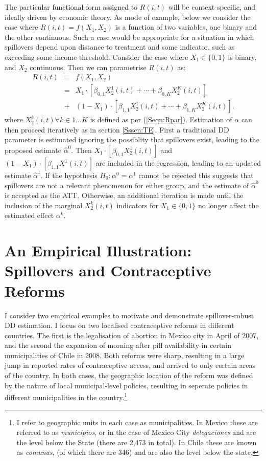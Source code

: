 The particular functional form assigned to $R(i,t)$ will be context-specific,
and ideally driven by economic theory.  As mode of example, below we consider the
case where $R(i,t)=f(X_1,X_2)$ is a function of two variables, one binary and
the other continuous.  Such a case would be appropriate for a situation in which
spillovers depend upon distance to treatment and some indicator, such as exceeding
some income threshold.  Consider the case where $X_1\in \{0,1\}$ is binary, and 
$X_2$ continuous.  Then we can parametrise $R(i,t)$ as:
\begin{eqnarray}
R(i,t)&=&f(X_1,X_2) \nonumber \\
      &=&X_1\cdot[\beta_{0,1}X_2^1(i,t)+ \cdots + \beta_{0,K}X_2^K(i,t)] \nonumber \\
      &+& (1-X_1)\cdot[\beta_{1,1}X_2^1(i,t)+ \cdots + \beta_{1,K}X_2^K(i,t)]. \nonumber
\end{eqnarray}
where $X_2^k(i,t) \forall k \in 1\ldots K$ is defined as per (\ref{Seqn:Rpar}).  
Estimation of $\alpha$ 
can then proceed iteratively as in section \ref{Ssscn:TE}.  First a traditional 
DD parameter is estimated ignoring the possiblity that spillovers exist, leading 
to the proposed estimate $\hat\alpha^0$.  Then $X_1\cdot[\beta_{0,1}X_2^1(i,t)]$ 
and $(1-X_1)\cdot[\beta_{1,1}X^1(i,t)]$ are included in the regression, leading to 
an updated estimate $\hat\alpha^1$.  If the hypothesis $H_0: \alpha^0=\alpha^1$ 
cannot be rejected this suggests that spillovers are not a relevant phenomenon 
for either group, and the estimate of $\hat\alpha^0$ is accepted as the ATT.  
Otherwise, an additional iteration is made until the inclusion of the marginal 
$X_2^k(i,t)$ indicators for $X_1 \in \{0,1\}$ no longer affect the estimated 
effect $\alpha^k$.

\section{An Empirical Illustration: Spillovers and Contraceptive Reforms}
\label{Sscn:empirics}
I consider two empirical examples to motivate and demonstrate spillover-robust 
DD estimation.  I focus on two localised contraceptive reforms in different 
countries. The first is the legalisation of abortion in Mexico city in April of 
2007, and the second the expansion of morning after pill availability in certain 
municipalities of Chile in 2008.  Both reforms were sharp, resulting in a large 
jump in reported rates of contraceptive access, and arrived to only certain areas 
of the country.  In both cases, the geographic location of the reform was defined 
by the nature of local municipal-level policies, resulting in seperate policies 
in different municipalities in the country.\footnote{I refer to geographic units 
in each case as municipalities.  In Mexico these are referred to as 
\emph{municipios}, or in the case of Mexico City \emph{delegaciones} and are the 
level below the State (there are 2,473 in total).  In Chile these are known as 
\emph{comunas}, (of which there are 346) and are also the level below the state.}

